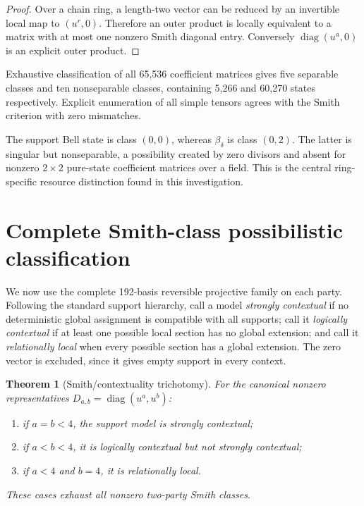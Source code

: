 \documentclass[11pt]{article}
\newtheorem{theorem}{Theorem}
\begin{document}
\begin{proof}
Over a chain ring, a length-two vector can be reduced by an invertible local
map to $(u^r,0)$.  Therefore an outer product is locally equivalent to a
matrix with at most one nonzero Smith diagonal entry.  Conversely
$\operatorname{diag}(u^a,0)$ is an explicit outer product.
\end{proof}

Exhaustive classification of all 65,536 coefficient matrices gives five
separable classes and ten nonseparable classes, containing 5,266 and 60,270
states respectively.  Explicit enumeration of all simple tensors agrees with
the Smith criterion with zero mismatches.

The support Bell state is class $(0,0)$, whereas $\beta_\delta$ is class
$(0,2)$.  The latter is singular but nonseparable, a possibility created by
zero divisors and absent for nonzero $2\times2$ pure-state coefficient matrices
over a field.  This is the central ring-specific resource distinction found in
this investigation.

\section{Complete Smith-class possibilistic classification}

We now use the complete 192-basis reversible projective family on each party.
Following the standard support hierarchy, call a model \emph{strongly
contextual} if no deterministic global assignment is compatible with all
supports; call it \emph{logically contextual} if at least one possible local
section has no global extension; and call it \emph{relationally local} when
every possible section has a global extension.  The zero vector is excluded,
since it gives empty support in every context.

\begin{theorem}[Smith/contextuality trichotomy]
For the canonical nonzero representatives
$D_{a,b}=\operatorname{diag}(u^a,u^b)$:
\begin{enumerate}
\item if $a=b<4$, the support model is strongly contextual;
\item if $a<b<4$, it is logically contextual but not strongly contextual;
\item if $a<4$ and $b=4$, it is relationally local.
\end{enumerate}
These cases exhaust all nonzero two-party Smith classes.
\end{theorem}
\end{document}
